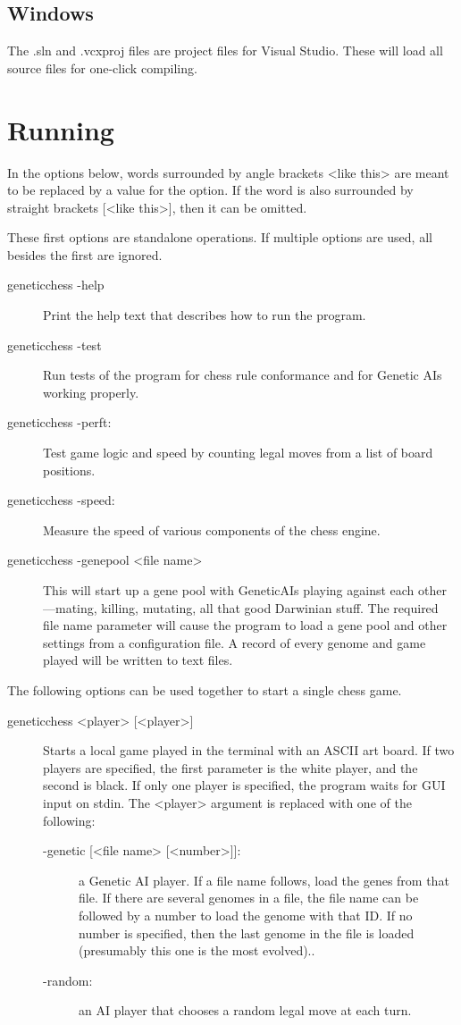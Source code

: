 \documentclass[letterpaper]{article}
\newcommand{\code}[1]{\small\textsf{#1}}
\renewcommand{\_}{\allowbreak\textunderscore\allowbreak}
\begin{document}
\subsection{Windows}
The \code{.sln} and \code{.vcxproj} files are project files for Visual Studio. These will load all source files for one-click compiling.


\section{Running}\label{running}

In the options below, words surrounded by angle brackets \code{<like this>} are meant to be replaced by a value for the option. If the word is also surrounded by straight brackets \code{[<like this>]}, then it can be omitted.

These first options are standalone operations. If multiple options are used, all besides the first are ignored.
\begin{description}
	\item[\code{genetic\_chess -help}] Print the help text that describes how to run the program.
	\item[\code{genetic\_chess -test}] Run tests of the program for chess rule conformance and for Genetic AIs working properly.
	\item[\code{genetic\_chess -perft}:] Test game logic and speed by counting legal moves from a list of board positions.
	\item[\code{genetic\_chess -speed}:] Measure the speed of various components of the chess engine.
	\item[\code{genetic\_chess -genepool <file name>}]
This will start up a gene pool with Genetic\_AIs playing against each other---mating, killing, mutating, all that good Darwinian stuff. The required file name parameter will cause the program to load a gene pool and other settings from a configuration file. A record of every genome and game played will be written to text files.
\end{description}
The following options can be used together to start a single chess game.
\begin{description}
	\item[\code{genetic\_chess <player> [<player>]}] Starts a local game played in the terminal with an ASCII art board. If two players are specified, the first parameter is the white player, and the second is black. If only one player is specified, the program waits for GUI input on stdin. The \code{<player>} argument is replaced with one of the following:
	\begin{description}
		\item[\code{-genetic [<file name> [<number>]]}:] a Genetic AI player. If a file name follows, load the genes from that file. If there are several genomes in a file, the file name can be followed by a number to load the genome with that ID\@. If no number is specified, then the last genome in the file is loaded (presumably this one is the most evolved)..
		\item[\code{-random}:] an AI player that chooses a random legal move at each turn.
	\end{description}
\end{description}
\end{document}
